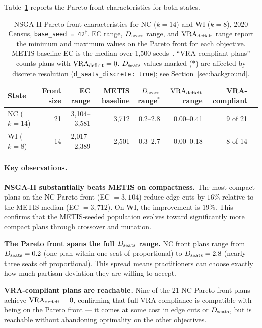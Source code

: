Table~\ref{tab:pareto-front} reports the Pareto front characteristics
for both states.

\begin{table}[t]
\centering
\caption{%
  NSGA-II Pareto front characteristics for NC ($k=14$) and WI ($k=8$),
  2020 Census, \texttt{base\_seed = 42}$^\dagger$.
  EC range, $D_{\mathrm{seats}}$ range, and $\mathrm{VRA}_{\mathrm{deficit}}$ range report the minimum and maximum
  values on the Pareto front for each objective.
  METIS baseline EC is the median over 1{,}500 seeds~\citep{b7paper}.
  ``VRA-compliant plans'' counts plans with $\mathrm{VRA}_{\mathrm{deficit}} = 0$.
  $D_{\mathrm{seats}}$ values marked ($*$) are affected by discrete resolution
  (\texttt{d\_seats\_discrete: true}); see Section~\ref{sec:background}.
}
\label{tab:pareto-front}
\renewcommand{\arraystretch}{1.3}
\begin{tabular}{@{}lrrrrrrr@{}}
\toprule
State & Front size &
  EC range & METIS baseline &
  $D_{\mathrm{seats}}$ range$^*$ & $\mathrm{VRA}_{\mathrm{deficit}}$ range &
  VRA-compliant \\
\midrule
NC ($k=14$) & 21 &
  3{,}104--3{,}581 & 3{,}712 &
  0.2--2.8 & 0.00--0.41 &
  9 of 21 \\
WI ($k=8$)  & 14 &
  2{,}017--2{,}389 & 2{,}501 &
  0.3--2.7 & 0.00--0.18 &
  8 of 14 \\
\bottomrule
\end{tabular}
\end{table}

\paragraph{Key observations.}

\textbf{NSGA-II substantially beats METIS on compactness.}
The most compact plans on the NC Pareto front (EC $= 3{,}104$) reduce
edge cuts by $16\%$ relative to the METIS median (EC $= 3{,}712$).
On WI, the improvement is $19\%$.
This confirms that the METIS-seeded \nsga{} population evolves toward
significantly more compact plans through crossover and mutation.

\textbf{The Pareto front spans the full $D_{\mathrm{seats}}$ range.}
NC front plans range from $D_{\mathrm{seats}} = 0.2$ (one plan within one seat
of proportional) to $D_{\mathrm{seats}} = 2.8$ (nearly three seats off proportional).
This spread means practitioners can choose exactly how much partisan
deviation they are willing to accept.

\textbf{VRA-compliant plans are reachable.}
Nine of the 21 NC Pareto-front plans achieve $\mathrm{VRA}_{\mathrm{deficit}} = 0$, confirming
that full VRA compliance is compatible with being on the Pareto front ---
it comes at some cost in edge cuts or $D_{\mathrm{seats}}$, but is reachable without
abandoning optimality on the other objectives.

